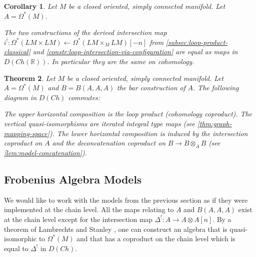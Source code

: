 \documentclass{scrartcl}
\theoremstyle{plain}
\newtheorem{theorem}{Theorem}[section]
\newtheorem{corollary}[theorem]{Corollary}
\theoremstyle{definition}
\newcommand{\R}{\mathbb R}
\newcommand{\quiso}{\simeq}
\newcommand{\from}{\leftarrow}
\DeclareMathOperator{\id}{id}
\begin{document}
\begin{corollary}\label{thm:loop-products-identity}
    Let $M$ be a closed oriented, simply connected manifold. Let $A = \Omega^*(M)$.

    The two constructions of the derived intersection map $i^!\colon\Omega^*(LM\times LM) \from \Omega^{*}(LM\times_M LM)[-n]$ from \cref{subsec:loop-product-classical} and \cref{constr:loop-intersection-via-configuration} are equal as maps in $D(Ch(\R))$. In particular they are the same on cohomology.
\end{corollary}

\begin{theorem}\label{thm:loop-product-derived}
    Let $M$ be a closed oriented, simply connected manifold. Let $A = \Omega^*(M)$ and $B=B(A, A, A)$ the bar construction of $A$.
    The following diagram in $D(Ch)$ commutes:
    \begin{center}
    \end{center}
    The upper horizontal composition is the loop product (cohomology coproduct). The vertical quasi-isomorphisms are iterated integral type maps (see \cref{thm:graph-mapping-space}). The lower horizontal composition is induced by the intersection coproduct on $A$ and the deconcatenation coproduct on $B\to B\otimes_A B$ (see \cref{lem:model-concatenation}).
\end{theorem}

\subsection{Frobenius Algebra Models}\label{subsec:poincare-algebra}

We would like to work with the models from the previous section as if they were implemented at the chain level. All the maps relating to $A$ and $B(A, A, A)$ exist at the chain level except for the intersection map $\Delta^!\colon A\to A\otimes A[n]$. 
By a theorem of Lambrechts and Stanley \cite{lambrechts2008poincare}, one can construct an algebra that is quasi-isomorphic to $\Omega^*(M)$ and that has a coproduct on the chain level which is equal to $\Delta^!$ in $D(Ch)$. 
\end{document}
